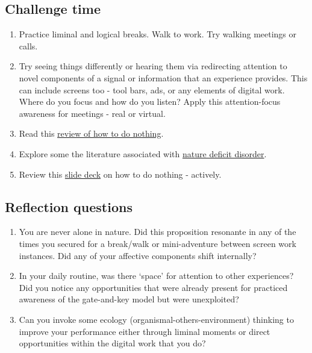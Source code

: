 \documentclass[
]{book}
\providecommand{\tightlist}{%
  \setlength{\itemsep}{0pt}\setlength{\parskip}{0pt}}
\begin{document}
\hypertarget{challenge-time-2}{%
\subsection*{Challenge time}\label{challenge-time-2}}

\begin{enumerate}
\def\labelenumi{\arabic{enumi}.}
\tightlist
\item
  Practice liminal and logical breaks. Walk to work. Try walking meetings or calls.
\item
  Try seeing things differently or hearing them via redirecting attention to novel components of a signal or information that an experience provides. This can include screens too - tool bars, ads, or any elements of digital work. Where do you focus and how do you listen? Apply this attention-focus awareness for meetings - real or virtual.\\
\item
  Read this \href{https://www.nytimes.com/2019/04/30/books/review/jenny-odell-how-to-do-nothing.html}{review of how to do nothing}.\\
\item
  Explore some the literature associated with \href{https://en.wikipedia.org/wiki/Nature_deficit_disorder}{nature deficit disorder}.\\
\item
  Review this \href{https://figshare.com/articles/presentation/How_to_do_nothing/19736179}{slide deck} on how to do nothing - actively.
\end{enumerate}

\hypertarget{reflection-questions-2}{%
\subsection*{Reflection questions}\label{reflection-questions-2}}

\begin{enumerate}
\def\labelenumi{\arabic{enumi}.}
\tightlist
\item
  You are never alone in nature. Did this proposition resonante in any of the times you secured for a break/walk or mini-adventure between screen work instances. Did any of your affective components shift internally?\\
\item
  In your daily routine, was there `space' for attention to other experiences? Did you notice any opportunities that were already present for practiced awareness of the gate-and-key model but were unexploited?\\
\item
  Can you invoke some ecology (organismal-others-environment) thinking to improve your performance either through liminal moments or direct opportunities within the digital work that you do?
\end{enumerate}

  
\end{document}
